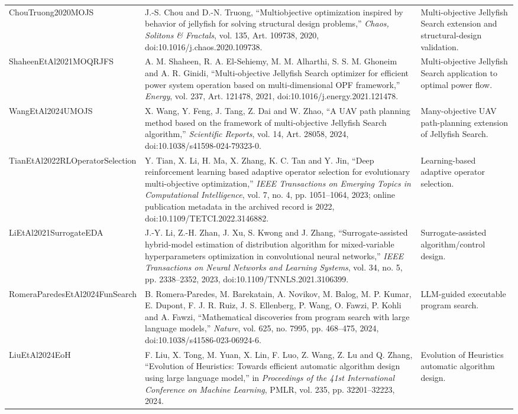 \documentclass[9pt]{article}
\begin{document}
\begin{longtable}{P{3.1cm}P{8.5cm}P{3.2cm}}
ChouTruong2020MOJS & J.-S. Chou and D.-N. Truong, ``Multiobjective optimization inspired by behavior of jellyfish for solving structural design problems,'' \textit{Chaos, Solitons \& Fractals}, vol. 135, Art. 109738, 2020, doi:10.1016/j.chaos.2020.109738. & Multi-objective Jellyfish Search extension and structural-design validation.\\
ShaheenEtAl2021MOQRJFS & A. M. Shaheen, R. A. El-Sehiemy, M. M. Alharthi, S. S. M. Ghoneim and A. R. Ginidi, ``Multi-objective Jellyfish Search optimizer for efficient power system operation based on multi-dimensional OPF framework,'' \textit{Energy}, vol. 237, Art. 121478, 2021, doi:10.1016/j.energy.2021.121478. & Multi-objective Jellyfish Search application to optimal power flow.\\
WangEtAl2024UMOJS & X. Wang, Y. Feng, J. Tang, Z. Dai and W. Zhao, ``A UAV path planning method based on the framework of multi-objective Jellyfish Search algorithm,'' \textit{Scientific Reports}, vol. 14, Art. 28058, 2024, doi:10.1038/s41598-024-79323-0. & Many-objective UAV path-planning extension of Jellyfish Search.\\
TianEtAl2022RLOperatorSelection & Y. Tian, X. Li, H. Ma, X. Zhang, K. C. Tan and Y. Jin, ``Deep reinforcement learning based adaptive operator selection for evolutionary multi-objective optimization,'' \textit{IEEE Transactions on Emerging Topics in Computational Intelligence}, vol. 7, no. 4, pp. 1051--1064, 2023; online publication metadata in the archived record is 2022, doi:10.1109/TETCI.2022.3146882. & Learning-based adaptive operator selection.\\
LiEtAl2021SurrogateEDA & J.-Y. Li, Z.-H. Zhan, J. Xu, S. Kwong and J. Zhang, ``Surrogate-assisted hybrid-model estimation of distribution algorithm for mixed-variable hyperparameters optimization in convolutional neural networks,'' \textit{IEEE Transactions on Neural Networks and Learning Systems}, vol. 34, no. 5, pp. 2338--2352, 2023, doi:10.1109/TNNLS.2021.3106399. & Surrogate-assisted algorithm/control design.\\
RomeraParedesEtAl2024FunSearch & B. Romera-Paredes, M. Barekatain, A. Novikov, M. Balog, M. P. Kumar, E. Dupont, F. J. R. Ruiz, J. S. Ellenberg, P. Wang, O. Fawzi, P. Kohli and A. Fawzi, ``Mathematical discoveries from program search with large language models,'' \textit{Nature}, vol. 625, no. 7995, pp. 468--475, 2024, doi:10.1038/s41586-023-06924-6. & LLM-guided executable program search.\\
LiuEtAl2024EoH & F. Liu, X. Tong, M. Yuan, X. Lin, F. Luo, Z. Wang, Z. Lu and Q. Zhang, ``Evolution of Heuristics: Towards efficient automatic algorithm design using large language model,'' in \textit{Proceedings of the 41st International Conference on Machine Learning}, PMLR, vol. 235, pp. 32201--32223, 2024. & Evolution of Heuristics automatic algorithm design.\\

\end{longtable}
\end{document}
